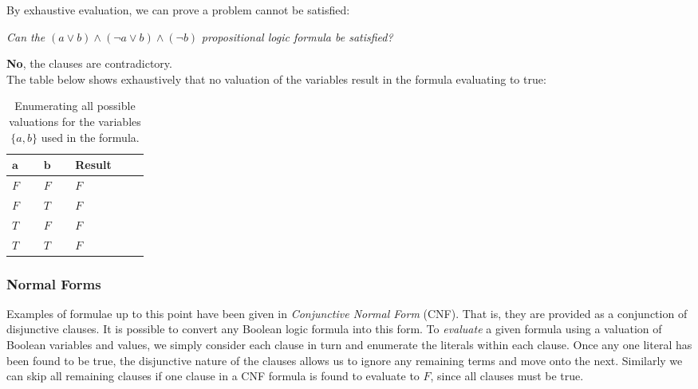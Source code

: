\documentclass[a4paper,openany,12pt]{book}
\begin{document}
By exhaustive evaluation, we can prove a problem cannot be satisfied:

\emph{Can the} \(
    (a \lor b) \land (\neg a \lor b) \land (\neg b)
\) \emph{propositional logic formula be satisfied?}

\textcolor{id7-ruby-red}{\textbf{No}}, the clauses are contradictory.\\
The table below shows exhaustively that no valuation of the variables result in the formula evaluating to true:

\def\arraystretch{1.5}%
\begin{table}[H]
    \centering
    \begin{tabular}[t]{|p{0.05\linewidth}|p{0.05\linewidth}|p{0.1\linewidth}|}
        \hline
        \rowcolor{id7-aubergine}
        {\color[HTML]{FFFFFF} $\mathbf{a}$} & {\color[HTML]{FFFFFF} $\mathbf{b}$} & {\color[HTML]{FFFFFF} \sffamily  \textbf{Result}} \\ \hline
        $F$ & $F$ & $F$  \\ \hline
        $F$ & $T$ & $F$  \\ \hline
        $T$ & $F$ & $F$  \\ \hline
        $T$ & $T$ & $F$  \\ \hline
    \end{tabular}
    \caption{Enumerating all possible valuations for the variables $\{a, b\}$ used in the formula.}
    \label{table:landingredesign}
\end{table}

\subsubsection{Normal Forms}

Examples of formulae up to this point have been given in \emph{Conjunctive Normal Form} (CNF).
That is, they are provided as a conjunction of disjunctive clauses.
It is possible to convert any Boolean logic formula into this form.
To \emph{evaluate} a given formula using a valuation of Boolean variables and values, we simply consider each clause in
turn and enumerate the literals within each clause.
Once any one literal has been found to be true, the disjunctive nature of the clauses allows us to ignore any remaining
terms and move onto the next.
Similarly we can skip all remaining clauses if one clause in a CNF formula is found to evaluate to $F$, since all
clauses must be true.
\end{document}
